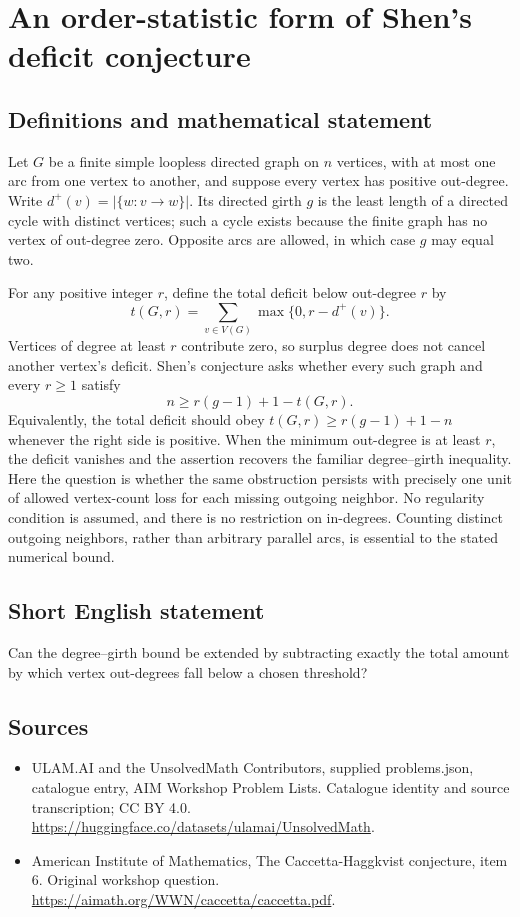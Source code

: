 \documentclass[11pt,a4paper]{article}
\begin{document}
\section*{An order-statistic form of Shen's deficit conjecture}\label{statement}

\subsection{Definitions and mathematical statement}
Let $G$ be a finite simple loopless directed graph on $n$ vertices, with at most one arc from one vertex to another, and suppose every vertex has positive out-degree.
Write $d^+(v)=|\{w:v\to w\}|$.
Its directed girth $g$ is the least length of a directed cycle with distinct vertices; such a cycle exists because the finite graph has no vertex of out-degree zero.
Opposite arcs are allowed, in which case $g$ may equal two.

For any positive integer $r$, define the total deficit below out-degree $r$ by
\[
 t(G,r)=\sum_{v\in V(G)}\max\{0,r-d^+(v)\}.
\]
Vertices of degree at least $r$ contribute zero, so surplus degree does not cancel another vertex's deficit.
Shen's conjecture asks whether every such graph and every $r\geq1$ satisfy
\[
 n\geq r(g-1)+1-t(G,r).
\]
Equivalently, the total deficit should obey
$t(G,r)\geq r(g-1)+1-n$ whenever the right side is positive.
When the minimum out-degree is at least $r$, the deficit vanishes and the assertion recovers the familiar degree--girth inequality.
Here the question is whether the same obstruction persists with precisely one unit of allowed vertex-count loss for each missing outgoing neighbor.
No regularity condition is assumed, and there is no restriction on in-degrees.
Counting distinct outgoing neighbors, rather than arbitrary parallel arcs, is essential to the stated numerical bound.
\subsection{Short English statement}
Can the degree--girth bound be extended by subtracting exactly the total amount by which vertex out-degrees fall below a chosen threshold?
\subsection{Sources}
\begin{itemize}
\item[S1] ULAM.AI and the UnsolvedMath Contributors, supplied problems.json, catalogue entry, AIM Workshop Problem Lists. Catalogue identity and source transcription; CC BY 4.0.
\url{https://huggingface.co/datasets/ulamai/UnsolvedMath}.
\item[S2] American Institute of Mathematics, The Caccetta-Haggkvist conjecture, item 6. Original workshop question.
\url{https://aimath.org/WWN/caccetta/caccetta.pdf}.
\end{itemize}
\end{document}
